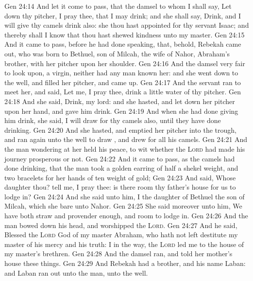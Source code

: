 \vs Gen 24:14 And let it come to pass, that the damsel to whom I shall say, Let down thy pitcher, I pray thee, that I may drink; and she shall say, Drink, and I will give thy camels drink also:  she  thou hast appointed for thy servant Isaac; and thereby shall I know that thou hast shewed kindness unto my master.
\vs Gen 24:15 And it came to pass, before he had done speaking, that, behold, Rebekah came out, who was born to Bethuel, son of Milcah, the wife of Nahor, Abraham's brother, with her pitcher upon her shoulder.
\vs Gen 24:16 And the damsel  very fair to look upon, a virgin, neither had any man known her: and she went down to the well, and filled her pitcher, and came up.
\vs Gen 24:17 And the servant ran to meet her, and said, Let me, I pray thee, drink a little water of thy pitcher.
\vs Gen 24:18 And she said, Drink, my lord: and she hasted, and let down her pitcher upon her hand, and gave him drink.
\vs Gen 24:19 And when she had done giving him drink, she said, I will draw  for thy camels also, until they have done drinking.
\vs Gen 24:20 And she hasted, and emptied her pitcher into the trough, and ran again unto the well to draw , and drew for all his camels.
\vs Gen 24:21 And the man wondering at her held his peace, to wit whether the \textsc{Lord} had made his journey prosperous or not.
\vs Gen 24:22 And it came to pass, as the camels had done drinking, that the man took a golden earring of half a shekel weight, and two bracelets for her hands of ten  weight of gold;
\vs Gen 24:23 And said, Whose daughter  thou? tell me, I pray thee: is there room  thy father's house for us to lodge in?
\vs Gen 24:24 And she said unto him, I  the daughter of Bethuel the son of Milcah, which she bare unto Nahor.
\vs Gen 24:25 She said moreover unto him, We have both straw and provender enough, and room to lodge in.
\vs Gen 24:26 And the man bowed down his head, and worshipped the \textsc{Lord}.
\vs Gen 24:27 And he said, Blessed  the \textsc{Lord} God of my master Abraham, who hath not left destitute my master of his mercy and his truth: I  in the way, the \textsc{Lord} led me to the house of my master's brethren.
\vs Gen 24:28 And the damsel ran, and told  her mother's house these things.
\vs Gen 24:29 And Rebekah had a brother, and his name  Laban: and Laban ran out unto the man, unto the well.
